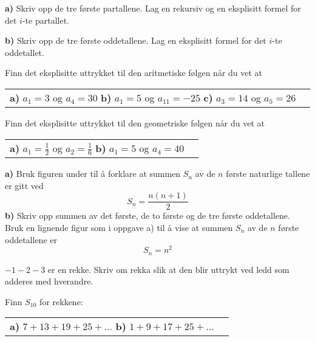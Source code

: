 




\opgt
\setcounter{section}{1}	

\textbf{a)} Skriv opp de tre første partallene. Lag en rekursiv og en eksplisitt formel for det $ i $-te partallet.\os
	
\textbf{b)} Skriv opp de tre første oddetallene. Lag en eksplisitt formel for det $ i $-te oddetallet. 

Finn det eksplisitte uttrykket til  den aritmetiske følgen når du vet at\os
\begin{tabular}{@{}l l}	
	\textbf{a)} $ a_1=3 $ og $ a_4 = 30 $ \os 
	\textbf{b)} $ a_1 = 5 $ og $ a_{11} = -25 $ \os
	\textbf{c)} $ a_3 =14 $ og $ a_5=26 $ 
\end{tabular}\os

Finn det eksplisitte uttrykket til den geometriske følgen når du vet at\os
\begin{tabular}{@{}l l}	
	\textbf{a)} $ a_1=\frac{1}{2} $ og $ a_2 = \frac{1}{6} $ \os 
	\textbf{b)} $ a_1 = 5 $ og $ a_4 = 40 $
\end{tabular} \os

\begin{comment}
	\op
Bruk formelen fra oppgave \textsl{\ref{sumkvad}a} og det eksplisitte uttrykket for en aritmetisk følge til å forklare at summen av en aritmetisk rekke kan skrives som:
\[na_1 +\frac{dn(n-1)}{2} \]


\op
a) Bruk (\ref{sumg}) og vis at summen $ S_\infty $ når $ n\to\infty $ blir:
\[ S_\infty=a_1\frac{1}{1-k} \]
for $ |k|<1 $.
\end{comment}
\nes

\textbf{a)} Bruk figuren under til å forklare at summen $ S_n $ av de $ n $ første naturlige tallene er gitt ved
\[S_n=\frac{n(n+1)}{2}  \]
\textbf{b)} Skriv opp summen av det første, de to første og de tre første  oddetallene. Bruk en lignende figur som i oppgave a) til å vise at summen $ S_n $ av de $ n $ første oddetallene er
\[ S_n = n^2 \] 

$ -1-2-3 $ er en rekke. Skriv om rekka slik at den blir uttrykt ved ledd som adderes med hverandre. 

Finn $ S_{10} $ for rekkene:\os
\begin{tabular}{@{}l l}	
	\textbf{a)} $ 7+13+19+25+\ldots $\quad
	\textbf{b)} $ 1+9+17+25+\ldots $
\end{tabular} \os

